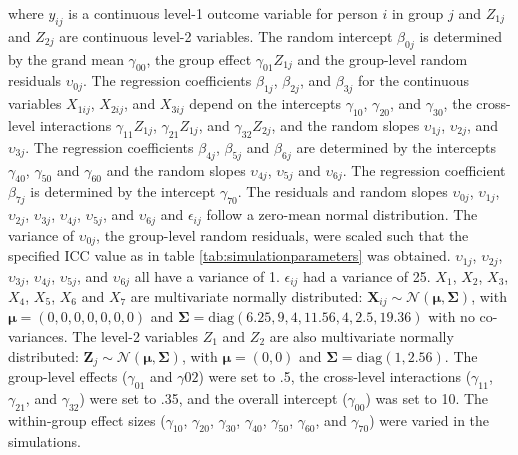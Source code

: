 \documentclass[10pt, a4paper, titlepage]{article}
\begin{document}
\begin{subequations}
\end{subequations} where $y_{ij}$ is a continuous level-1 outcome variable for person $i$ in group $j$ and $Z_{1j}$ and $Z_{2j}$ are continuous level-2 variables. The random intercept $\beta_{0j}$ is determined by the grand mean $\gamma_{00}$, the group effect $\gamma_{01}Z_{1j}$ and the group-level random residuals $\upsilon_{0j}$. The regression coefficients $\beta_{1j}$, $\beta_{2j}$, and $\beta_{3j}$ for the continuous variables $X_{1ij}$, $X_{2ij}$, and $X_{3ij}$ depend on the intercepts $\gamma_{10}$, $\gamma_{20}$, and $\gamma_{30}$, the cross-level interactions $\gamma_{11}Z_{1j}$, $\gamma_{21}Z_{1j}$, and $\gamma_{32}Z_{2j}$, and the random slopes $\upsilon_{1j}$, $\upsilon_{2j}$, and $\upsilon_{3j}$. The regression coefficients $\beta_{4j}$, $\beta_{5j}$ and $\beta_{6j}$ are determined by the intercepts $\gamma_{40}$, $\gamma_{50}$ and $\gamma_{60}$ and the random slopes $\upsilon_{4j}$, $\upsilon_{5j}$ and $\upsilon_{6j}$. The regression coefficient $\beta_{7j}$ is determined by the intercept $\gamma_{70}$. The residuals and random slopes $\upsilon_{0j}$, $\upsilon_{1j}$, $\upsilon_{2j}$, $\upsilon_{3j}$, $\upsilon_{4j}$, $\upsilon_{5j}$, and $\upsilon_{6j}$ and $\epsilon_{ij}$ follow a zero-mean normal distribution. The variance of $\upsilon_{0j}$, the group-level random residuals, were scaled such that the specified ICC value as in table \ref{tab:simulationparameters} was obtained. $\upsilon_{1j}$, $\upsilon_{2j}$, $\upsilon_{3j}$, $\upsilon_{4j}$, $\upsilon_{5j}$, and $\upsilon_{6j}$ all have a variance of 1. $\epsilon_{ij}$ had a variance of 25. $X_1$, $X_2$, $X_3$, $X_4$, $X_5$, $X_6$ and $X_7$ are multivariate normally distributed: $\mathbf{X}_{ij} \sim \mathcal{N}(\boldsymbol{\mu}, \boldsymbol{\Sigma})$, with $\boldsymbol{\mu} = (0, 0, 0, 0, 0, 0, 0)$ and $\boldsymbol{\Sigma} = \text{diag}(6.25, 9, 4, 11.56, 4, 2.5, 19.36)$ with no co-variances. The level-2 variables $Z_1$ and $Z_2$ are also multivariate normally distributed:  $\mathbf{Z}_{j} \sim \mathcal{N}(\boldsymbol{\mu}, \boldsymbol{\Sigma})$, with $\boldsymbol{\mu} = (0, 0)$ and $\boldsymbol{\Sigma} = \text{diag}(1, 2.56)$. The group-level effects ($\gamma_{01}$ and $\gamma{02}$) were set to .5, the cross-level interactions ($\gamma_{11}$, $\gamma_{21}$, and $\gamma_{32}$) were set to .35, and the overall intercept ($\gamma_{00}$) was set to 10. The within-group effect sizes ($\gamma_{10}$, $\gamma_{20}$, $\gamma_{30}$, $\gamma_{40}$, $\gamma_{50}$, $\gamma_{60}$, and $\gamma_{70}$) were varied in the simulations.
\end{document}
